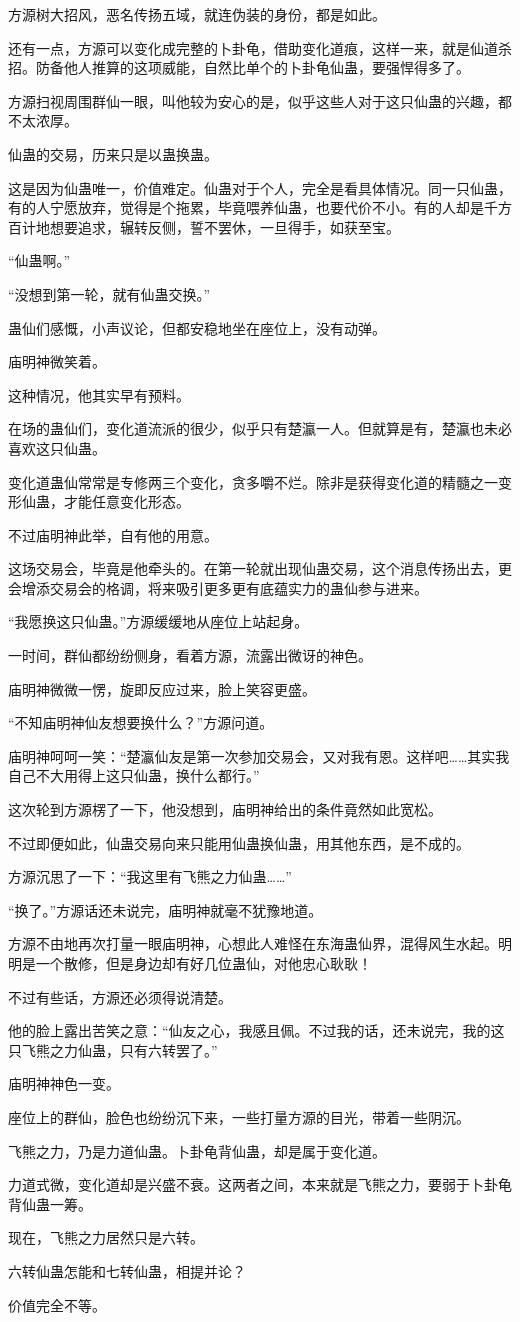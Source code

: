\begin{this_body}
方源树大招风，恶名传扬五域，就连伪装的身份，都是如此。

还有一点，方源可以变化成完整的卜卦龟，借助变化道痕，这样一来，就是仙道杀招。防备他人推算的这项威能，自然比单个的卜卦龟仙蛊，要强悍得多了。

方源扫视周围群仙一眼，叫他较为安心的是，似乎这些人对于这只仙蛊的兴趣，都不太浓厚。

仙蛊的交易，历来只是以蛊换蛊。

这是因为仙蛊唯一，价值难定。仙蛊对于个人，完全是看具体情况。同一只仙蛊，有的人宁愿放弃，觉得是个拖累，毕竟喂养仙蛊，也要代价不小。有的人却是千方百计地想要追求，辗转反侧，誓不罢休，一旦得手，如获至宝。

“仙蛊啊。”

“没想到第一轮，就有仙蛊交换。”

蛊仙们感慨，小声议论，但都安稳地坐在座位上，没有动弹。

庙明神微笑着。

这种情况，他其实早有预料。

在场的蛊仙们，变化道流派的很少，似乎只有楚瀛一人。但就算是有，楚瀛也未必喜欢这只仙蛊。

变化道蛊仙常常是专修两三个变化，贪多嚼不烂。除非是获得变化道的精髓之一变形仙蛊，才能任意变化形态。

不过庙明神此举，自有他的用意。

这场交易会，毕竟是他牵头的。在第一轮就出现仙蛊交易，这个消息传扬出去，更会增添交易会的格调，将来吸引更多更有底蕴实力的蛊仙参与进来。

“我愿换这只仙蛊。”方源缓缓地从座位上站起身。

一时间，群仙都纷纷侧身，看着方源，流露出微讶的神色。

庙明神微微一愣，旋即反应过来，脸上笑容更盛。

“不知庙明神仙友想要换什么？”方源问道。

庙明神呵呵一笑：“楚瀛仙友是第一次参加交易会，又对我有恩。这样吧……其实我自己不大用得上这只仙蛊，换什么都行。”

这次轮到方源楞了一下，他没想到，庙明神给出的条件竟然如此宽松。

不过即便如此，仙蛊交易向来只能用仙蛊换仙蛊，用其他东西，是不成的。

方源沉思了一下：“我这里有飞熊之力仙蛊……”

“换了。”方源话还未说完，庙明神就毫不犹豫地道。

方源不由地再次打量一眼庙明神，心想此人难怪在东海蛊仙界，混得风生水起。明明是一个散修，但是身边却有好几位蛊仙，对他忠心耿耿！

不过有些话，方源还必须得说清楚。

他的脸上露出苦笑之意：“仙友之心，我感且佩。不过我的话，还未说完，我的这只飞熊之力仙蛊，只有六转罢了。”

庙明神神色一变。

座位上的群仙，脸色也纷纷沉下来，一些打量方源的目光，带着一些阴沉。

飞熊之力，乃是力道仙蛊。卜卦龟背仙蛊，却是属于变化道。

力道式微，变化道却是兴盛不衰。这两者之间，本来就是飞熊之力，要弱于卜卦龟背仙蛊一筹。

现在，飞熊之力居然只是六转。

六转仙蛊怎能和七转仙蛊，相提并论？

价值完全不等。

\end{this_body}

